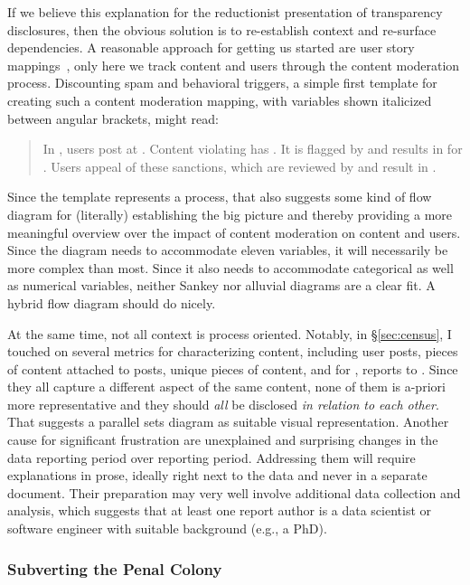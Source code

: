 If we believe this explanation for the reductionist presentation of transparency
disclosures, then the obvious solution is to re-establish context and re-surface
dependencies. A reasonable approach for getting us started are user story
mappings~\cite{PattonEconomy2014}, only here we track content and users through
the content moderation process. Discounting spam and behavioral triggers, a
simple first template for creating such a content moderation mapping, with
variables shown italicized between angular brackets, might read:
\begin{quote}
In , users post  at . Content violating
 has . It is flagged by  and
results in  for . Users appeal 
of these sanctions, which are reviewed by  and result in
.
\end{quote}
Since the template represents a process, that also suggests some kind of flow
diagram for (literally) establishing the big picture and thereby providing a
more meaningful overview over the impact of content moderation on content and
users. Since the diagram needs to accommodate eleven variables, it will
necessarily be more complex than most. Since it also needs to accommodate
categorical as well as numerical variables, neither Sankey nor alluvial diagrams
are a clear fit. A hybrid flow diagram should do nicely.

At the same time, not all context is process oriented. Notably, in
\S\ref{sec:census}, I touched on several metrics for characterizing content,
including user posts, pieces of content attached to posts, unique pieces of
content, and for \CSAM, reports to \NCMEC. Since they all capture a different
aspect of the same content, none of them is a-priori more representative and
they should \emph{all} be disclosed \emph{in relation to each other}. That
suggests a parallel sets diagram as suitable visual representation. Another
cause for significant frustration are unexplained and surprising changes in the
data reporting period over reporting period. Addressing them will require
explanations in prose, ideally right next to the data and never in a separate
document. Their preparation may very well involve additional data collection and
analysis, which suggests that at least one report author is a data scientist or
software engineer with suitable background (e.g., a PhD).


\subsubsection{Subverting the Penal Colony}


